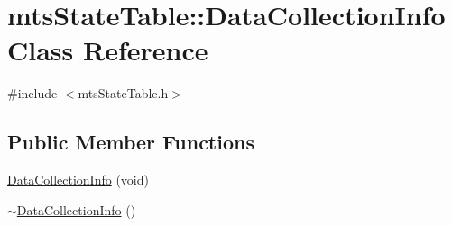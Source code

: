 \hypertarget{classmts_state_table_1_1_data_collection_info}{}\section{mts\+State\+Table\+:\+:Data\+Collection\+Info Class Reference}
\label{classmts_state_table_1_1_data_collection_info}


{\ttfamily \#include $<$mts\+State\+Table.\+h$>$}

\subsection*{Public Member Functions}
\begin{DoxyCompactItemize}
\item 
\hyperlink{classmts_state_table_1_1_data_collection_info_a4bea45a6f77776c4fc6f6d3b20081d1f}{Data\+Collection\+Info} (void)
\item 
\hyperlink{classmts_state_table_1_1_data_collection_info_a7f10caf2d470b238ce2ca9907c2b2cee}{$\sim$\+Data\+Collection\+Info} ()
\end{DoxyCompactItemize}
